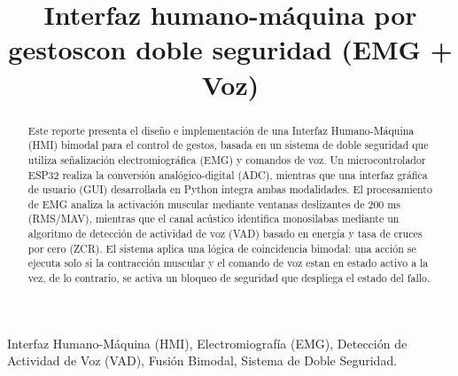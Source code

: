 \documentclass[conference]{IEEEtran}
\begin{document}
\title{Interfaz humano-m\'aquina por gestoscon doble seguridad (EMG + Voz)\\
}
\author{
  \and
  \and
}

\maketitle

\begin{abstract}
Este reporte presenta el diseño e implementación de una Interfaz Humano-M\'aquina (HMI) bimodal para el control de gestos, basada en un sistema de doble seguridad que utiliza se\~nalizaci\'on electromiogr\'afica (EMG) y comandos de voz. Un microcontrolador ESP32 realiza la conversi\'on anal\'ogico-digital (ADC), mientras que una interfaz gr\'afica de usuario (GUI) desarrollada en Python integra ambas modalidades. El procesamiento de EMG analiza la activaci\'on muscular mediante ventanas deslizantes de 200 ms (RMS/MAV), mientras que el canal ac\'ustico identifica monosilabas mediante un algoritmo de detecci\'on de actividad de voz (VAD) basado en energ\'ia y tasa de cruces por cero (ZCR). El sistema aplica una l\'ogica de coincidencia bimodal: una acci\'on se ejecuta solo si la contracci\'on muscular y el comando de voz estan en estado activo a la vez, de lo contrario, se activa un bloqueo de seguridad que despliega el estado del fallo.
\end{abstract}

\begin{IEEEkeywords}
Interfaz Humano-Máquina (HMI), Electromiografía (EMG), Detección de Actividad de Voz (VAD), Fusión Bimodal, Sistema de Doble Seguridad.
\end{IEEEkeywords}
\end{document}
